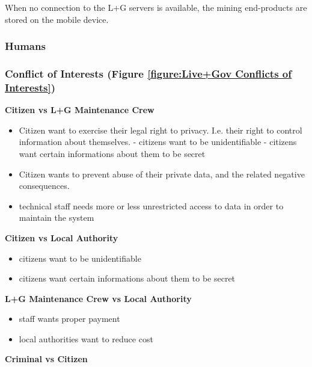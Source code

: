 When no connection to the L+G servers is available, the mining
end-products are stored on the mobile device.


\subsubsection{Humans}

\subsubsection{Conflict of Interests (Figure \ref{figure:Live+Gov Conflicts of Interests})}



\textbf{Citizen vs L+G Maintenance Crew}

\begin{itemize}


\item Citizen want to exercise their legal right to privacy. I.e. their right to control information about themselves.
- citizens want to be unidentifiable
- citizens want certain informations about them to be secret
\item Citizen wants to prevent abuse of their private data, and the related negative consequences.
\item
  technical staff needs more or less unrestricted access to data in
  order to maintain the system
\end{itemize}

\textbf{Citizen vs Local Authority}

\begin{itemize}

\item
  citizens want to be unidentifiable
\item
  citizens want certain informations about them to be secret
\end{itemize}

\textbf{L+G Maintenance Crew vs Local Authority}

\begin{itemize}

\item
  staff wants proper payment
\item
  local authorities want to reduce cost
\end{itemize}

\textbf{Criminal vs Citizen}

